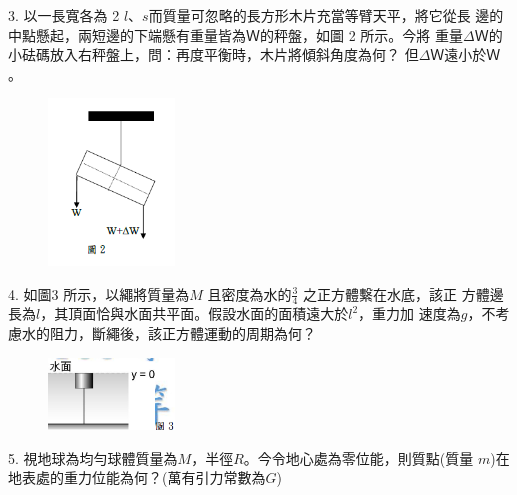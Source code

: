 \documentclass[cn,10pt,math=newtx]{elegantbook}
\begin{document}
\begin{example}
   3. 以一長寬各為 2 $l、s$而質量可忽略的長方形木片充當等臂天平，將它從長
邊的中點懸起，兩短邊的下端懸有重量皆為$Ｗ$的秤盤，如圖 2 所示。今將
重量$\Delta Ｗ$的小砝碼放入右秤盤上，問：再度平衡時，木片將傾斜角度為何？
但$\Delta Ｗ$遠小於$Ｗ$。\\
    \rightline{[高雄聯招教甄109]}
\end{example}
\begin{solution}
    
\end{solution}
\begin{figure}[htbp]
    \flushright
    \includegraphics[width=0.3\textwidth]{image/109高雄3.png}
  \end{figure}
\newpage

\begin{example}
   4. 如圖3 所示，以繩將質量為$M$ 且密度為水的$\frac{3}{4}$ 之正方體繫在水底，該正
方體邊長為$l$，其頂面恰與水面共平面。假設水面的面積遠大於$l^2$，重力加
速度為$g$，不考慮水的阻力，斷繩後，該正方體運動的周期為何？\\
    \rightline{[高雄聯招教甄109]}
\end{example}
\begin{solution}
    
\end{solution}
\begin{figure}[htbp]
    \flushright
    \includegraphics[width=0.3\textwidth]{image/109高雄4.png}
  \end{figure}
\newpage


\begin{example}
   5. 視地球為均勻球體質量為$M$，半徑$R$。今令地心處為零位能，則質點(質量
$m$)在地表處的重力位能為何？(萬有引力常數為$G$)\\
    \rightline{[高雄聯招教甄109]}
\end{example}
\begin{solution}
    
\end{solution}
\end{document}
